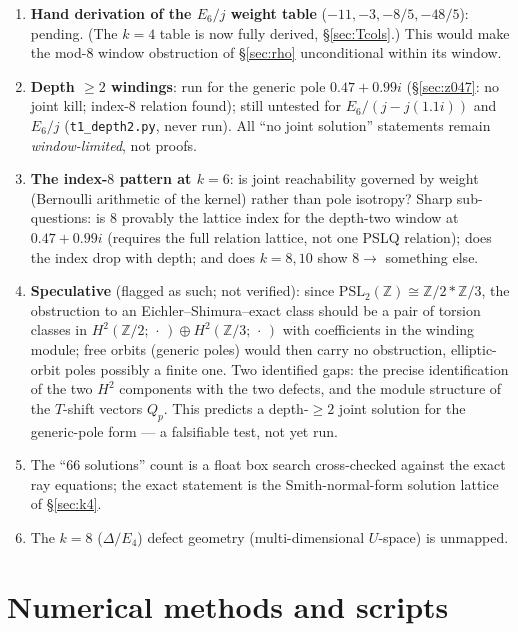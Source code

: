 \documentclass[11pt]{article}
\theoremstyle{definition}
\theoremstyle{remark}
\newcommand{\ZZ}{\mathbb{Z}}
\begin{document}
\begin{enumerate}
\item \textbf{Hand derivation of the $E_6/j$ weight table} ($-11,-3,-8/5,-48/5$):
pending.  (The $k=4$ table is now fully derived, \S\ref{sec:Tcols}.)  This would make the
mod-$8$ window obstruction of \S\ref{sec:rho} unconditional within its window.
\item \textbf{Depth $\ge2$ windings}: run for the generic pole $0.47+0.99i$
(\S\ref{sec:z047}: no joint kill; index-$8$ relation found); still untested for
$E_6/(j-j(1.1i))$ and $E_6/j$ (\texttt{t1\_depth2.py}, never run).  All ``no joint
solution'' statements remain \emph{window-limited}, not proofs.
\item \textbf{The index-$8$ pattern at $k=6$}: is joint reachability governed by weight
(Bernoulli arithmetic of the kernel) rather than pole isotropy?  Sharp sub-questions: is
$8$ provably the lattice index for the depth-two window at $0.47+0.99i$ (requires the
full relation lattice, not one PSLQ relation); does the index drop with depth; and does
$k=8,10$ show $8\to$ something else.
\item \textbf{Speculative} (flagged as such; not verified): since
$\mathrm{PSL}_2(\ZZ)\cong\ZZ/2*\ZZ/3$, the obstruction to an Eichler--Shimura--exact class
should be a pair of torsion classes in $H^2(\ZZ/2;\,\cdot\,)\oplus H^2(\ZZ/3;\,\cdot\,)$
with coefficients in the winding module; free orbits (generic poles) would then carry no
obstruction, elliptic-orbit poles possibly a finite one.  Two identified gaps: the precise
identification of the two $H^2$ components with the two defects, and the module structure
of the $T$-shift vectors $Q_p$.  This predicts a depth-$\ge2$ joint solution for the
generic-pole form --- a falsifiable test, not yet run.
\item The ``$66$ solutions'' count is a float box search cross-checked against the exact
ray equations; the exact statement is the Smith-normal-form solution lattice of
\S\ref{sec:k4}.
\item The $k=8$ ($\Delta/E_4$) defect geometry (multi-dimensional $U$-space) is unmapped.
\end{enumerate}

\appendix
\section{Numerical methods and scripts}\label{app:methods}
\end{document}
